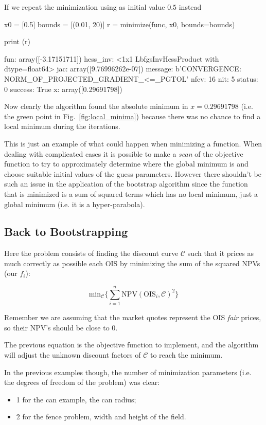 If we repeat the minimization using as initial value $0.5$ instead
\begin{ipython}
x0 = [0.5]
bounds = [(0.01, 20)]
r = minimize(func, x0, bounds=bounds)

print (r)
\end{ipython}
\begin{ioutput}
     fun: array([-3.17151711])
hess_inv: <1x1 LbfgsInvHessProduct with dtype=float64>
     jac: array([9.76996262e-07])
 message: b'CONVERGENCE: NORM_OF_PROJECTED_GRADIENT_<=_PGTOL'
    nfev: 16
     nit: 5
  status: 0
 success: True
       x: array([0.29691798])
\end{ioutput}
Now clearly the algorithm found the absolute minimum in $x=0.29691798$ (i.e. the green point in Fig.~\ref{fig:local_minima}) because there was no chance to find a local minimum during the iterations.

This is just an example of what could happen when minimizing a function. When dealing with complicated cases it is possible to make a \emph{scan} of the objective function to try to approximately determine where the global minimum is and choose suitable initial values of the guess parameters.
However there shouldn't be such an issue in the application of the bootstrap algorithm since the function that is minimized is a sum of squared terms which has no local minimum, just a global minimum (i.e. it is a hyper-parabola).

\subsection{Back to Bootstrapping}
\label{ois-example}

Here the problem consists of finding the discount curve $\mathcal{C}$ such that it prices as much correctly as possible each OIS by minimizing the sum of the squared NPVs (our $f_i$):

\begin{equation}
	\mathrm{min}_{\mathcal{C}} \Big\{\sum_{i=1}^{n}\mathrm{NPV}(\mathrm{OIS}_i, \mathcal{C})^2\Big\}
\end{equation}

Remember we are assuming that the market quotes represent the OIS \emph{fair} prices, so their NPV's should be close to 0.

The previous equation is the objective function to implement, and the algorithm will adjust the unknown discount factors of $\mathcal{C}$ to reach the minimum.

In the previous examples though, the number of minimization parameters (i.e. the degrees of freedom of the problem) was clear:
\begin{itemize}
\item 1 for the can example, the can radius;
\item 2 for the fence problem, width and height of the field.
\end{itemize}

